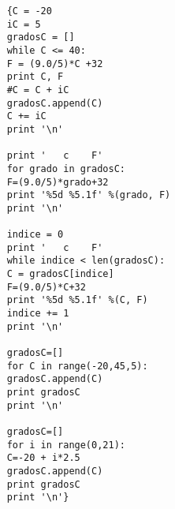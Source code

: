 \documentclass[letterpaper, 12pt, oneside]{article} %
\begin{document}
	\begin{verbatim}
	{C = -20
	iC = 5
	gradosC = []
	while C <= 40:
	F = (9.0/5)*C +32
	print C, F
	#C = C + iC
	gradosC.append(C)
	C += iC
	print '\n'
	
	print '   c    F'
	for grado in gradosC:
	F=(9.0/5)*grado+32
	print '%5d %5.1f' %(grado, F)
	print '\n'
	
	indice = 0
	print '   c    F'
	while indice < len(gradosC):
	C = gradosC[indice]
	F=(9.0/5)*C+32
	print '%5d %5.1f' %(C, F)
	indice += 1
	print '\n'
	
	gradosC=[]
	for C in range(-20,45,5):
	gradosC.append(C)
	print gradosC
	print '\n'
	
	gradosC=[]
	for i in range(0,21):
	C=-20 + i*2.5
	gradosC.append(C)
	print gradosC
	print '\n'}
	\end{verbatim}
\end{document}

